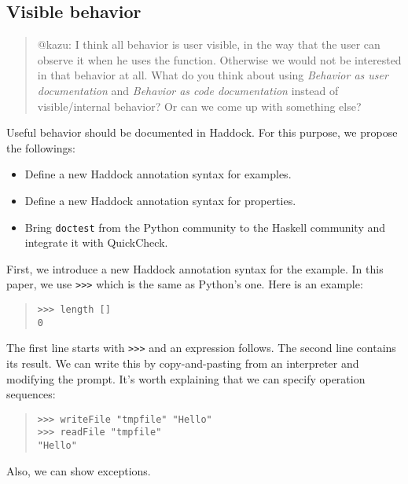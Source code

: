 \documentclass[preprint]{sigplanconf}
\begin{document}
\subsection{Visible behavior}
\label{sec:Visible-behavior}

\begin{quote}
    @kazu: I think all behavior is user visible, in the way that the user can
    observe it when he uses the function.  Otherwise we would not be interested
    in that behavior at all.  What do you think about using \emph{Behavior as
    user documentation} and \emph{Behavior as code documentation} instead of
    visible/internal behavior?  Or can we come up with something else?
\end{quote}

Useful behavior should be documented in Haddock.
For this purpose, we propose the followings:

\begin{itemize}
\item Define a new Haddock annotation syntax for examples.
\item Define a new Haddock annotation syntax for properties.
\item Bring {\tt doctest} from the Python community to the Haskell
community and integrate it with QuickCheck.
\end{itemize}

First, we introduce a new Haddock annotation syntax for the example.
In this paper, we use {\tt >>>} which is the same as Python's one.
Here is an example:

\begin{quote}
\small
\begin{verbatim}
>>> length []
0
\end{verbatim}
\end{quote}

\noindent The first line starts with {\tt >>>} and an expression follows. The second line contains its result. We can write this by copy-and-pasting from an interpreter and modifying the prompt.
It's worth explaining that we can specify operation sequences:

\begin{quote}
\small
\begin{verbatim}
>>> writeFile "tmpfile" "Hello"
>>> readFile "tmpfile"
"Hello"
\end{verbatim}
\end{quote}

\noindent Also, we can show exceptions.
\end{document}
